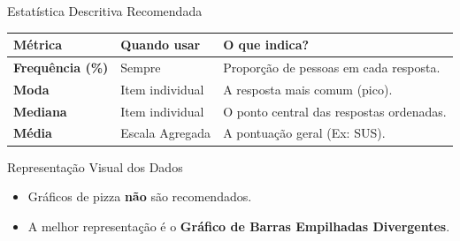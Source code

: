 \documentclass[aspectratio=169]{beamer}
\begin{document}
\begin{frame}{Estatística Descritiva Recomendada}
    \begin{center}
        \renewcommand{\arraystretch}{1.5}
        \begin{tabular}{l | l | l}
            \hline
            \textbf{Métrica} & \textbf{Quando usar} & \textbf{O que indica?} \\
            \hline
            \textbf{Frequência (\%)} & Sempre & Proporção de pessoas em cada resposta. \\
            \textbf{Moda} & Item individual & A resposta mais comum (pico). \\
            \textbf{Mediana} & Item individual & O ponto central das respostas ordenadas. \\
            \textbf{Média} & Escala Agregada & A pontuação geral (Ex: SUS). \\
            \hline
        \end{tabular}
    \end{center}
\end{frame}

\begin{frame}{Representação Visual dos Dados}
    \begin{itemize}
        \item Gráficos de pizza \textbf{não} são recomendados.
        \item A melhor representação é o \textbf{Gráfico de Barras Empilhadas Divergentes}.
    \end{itemize}
    \vspace{0.4cm}
    \begin{center}
    \end{center}
\end{frame}
\end{document}
